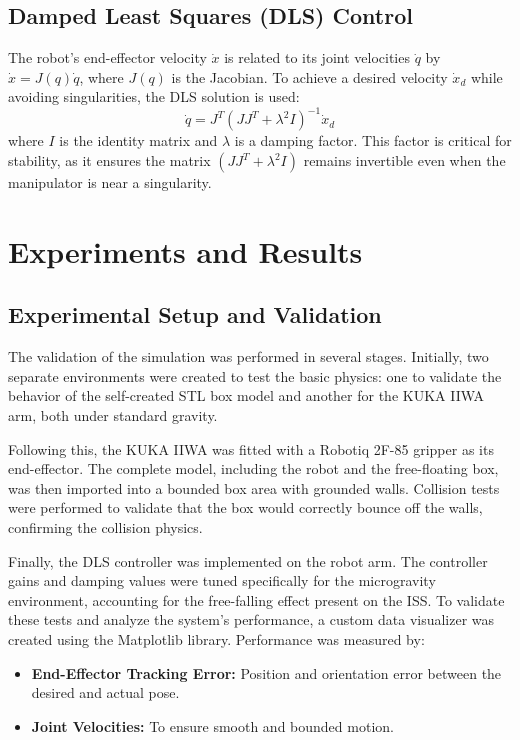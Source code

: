 \documentclass[journal]{IEEEtran}
\begin{document}
\subsection{Damped Least Squares (DLS) Control}
The robot's end-effector velocity $\dot{x}$ is related to its joint velocities $\dot{q}$ by $\dot{x} = J(q) \dot{q}$, where $J(q)$ is the Jacobian. To achieve a desired velocity $\dot{x}_d$ while avoiding singularities, the DLS solution is used:
\begin{equation}
\dot{q} = J^T (J J^T + \lambda^2 I)^{-1} \dot{x}_d
\label{eq:dls}
\end{equation}
where $I$ is the identity matrix and $\lambda$ is a damping factor. This factor is critical for stability, as it ensures the matrix $(J J^T + \lambda^2 I)$ remains invertible even when the manipulator is near a singularity.

\section{Experiments and Results}
\subsection{Experimental Setup and Validation}
The validation of the simulation was performed in several stages. Initially, two separate environments were created to test the basic physics: one to validate the behavior of the self-created STL box model and another for the KUKA IIWA arm, both under standard gravity.

Following this, the KUKA IIWA was fitted with a Robotiq 2F-85 gripper as its end-effector. The complete model, including the robot and the free-floating box, was then imported into a bounded box area with grounded walls. Collision tests were performed to validate that the box would correctly bounce off the walls, confirming the collision physics.

Finally, the DLS controller was implemented on the robot arm. The controller gains and damping values were tuned specifically for the microgravity environment, accounting for the free-falling effect present on the ISS. To validate these tests and analyze the system's performance, a custom data visualizer was created using the Matplotlib library. Performance was measured by:
\begin{itemize}
    \item \textbf{End-Effector Tracking Error:} Position and orientation error between the desired and actual pose.
    \item \textbf{Joint Velocities:} To ensure smooth and bounded motion.
\end{itemize}
\end{document}
